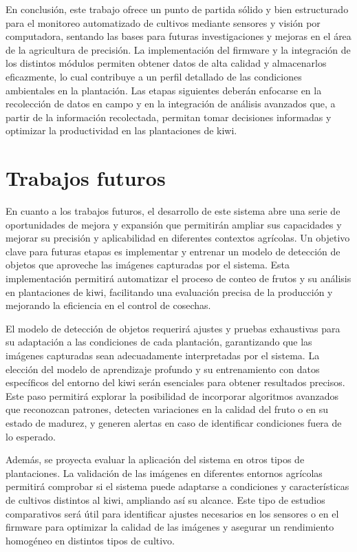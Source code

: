En conclusión, este trabajo ofrece un punto de partida sólido y bien estructurado para el monitoreo automatizado de cultivos mediante sensores y visión por computadora, sentando las bases para futuras investigaciones y mejoras en el área de la agricultura de precisión. La implementación del firmware y la integración de los distintos módulos permiten obtener datos de alta calidad y almacenarlos eficazmente, lo cual contribuye a un perfil detallado de las condiciones ambientales en la plantación. Las etapas siguientes deberán enfocarse en la recolección de datos en campo y en la integración de análisis avanzados que, a partir de la información recolectada, permitan tomar decisiones informadas y optimizar la productividad en las plantaciones de kiwi.

\newpage


\section{Trabajos futuros}

En cuanto a los trabajos futuros, el desarrollo de este sistema abre una serie de oportunidades de mejora y expansión que permitirán ampliar sus capacidades y mejorar su precisión y aplicabilidad en diferentes contextos agrícolas. Un objetivo clave para futuras etapas es implementar y entrenar un modelo de detección de objetos que aproveche las imágenes capturadas por el sistema. Esta implementación permitirá automatizar el proceso de conteo de frutos y su análisis en plantaciones de kiwi, facilitando una evaluación precisa de la producción y mejorando la eficiencia en el control de cosechas.

El modelo de detección de objetos requerirá ajustes y pruebas exhaustivas para su adaptación a las condiciones de cada plantación, garantizando que las imágenes capturadas sean adecuadamente interpretadas por el sistema. La elección del modelo de aprendizaje profundo y su entrenamiento con datos específicos del entorno del kiwi serán esenciales para obtener resultados precisos. Este paso permitirá explorar la posibilidad de incorporar algoritmos avanzados que reconozcan patrones, detecten variaciones en la calidad del fruto o en su estado de madurez, y generen alertas en caso de identificar condiciones fuera de lo esperado.

Además, se proyecta evaluar la aplicación del sistema en otros tipos de plantaciones. La validación de las imágenes en diferentes entornos agrícolas permitirá comprobar si el sistema puede adaptarse a condiciones y características de cultivos distintos al kiwi, ampliando así su alcance. Este tipo de estudios comparativos será útil para identificar ajustes necesarios en los sensores o en el firmware para optimizar la calidad de las imágenes y asegurar un rendimiento homogéneo en distintos tipos de cultivo.

